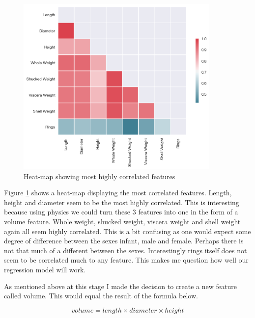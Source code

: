 \begin{figure}[H]
  \centering
  \includegraphics[scale=0.5,width=100mm]{./images/abalone-heatmap.png}
  \caption{Heat-map showing most highly correlated features}
  \label{fig:abalones-heatmap}
\end{figure}

Figure \ref{fig:abalones-heatmap} shows a heat-map displaying the most correlated features. Length, height and diameter seem to be the most highly correlated. This is interesting because using physics we could turn these 3 features into one in the form  of a volume feature. Whole weight, shucked weight, viscera weight and shell weight again all seem highly correlated. This is a bit confusing as one would expect some degree of difference between the sexes infant, male and female. Perhaps there is not that much of a different between the sexes. Interestingly rings itself does not seem to be correlated much to any feature. This makes me question how well our regression model will work. 

As mentioned above at this stage I made the decision to create a new feature called volume. This would equal the result of the formula below.

\begin{equation}
    volume = length \times diameter \times height
\end{equation}